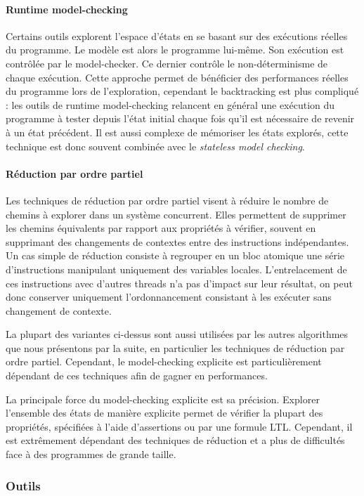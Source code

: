 \paragraph{Runtime model-checking}
Certains outils explorent l'espace d'états en se basant sur des
exécutions réelles du programme. Le modèle est alors le programme lui-même.
Son exécution est contrôlée par le model-checker. Ce dernier contrôle le
non-déterminisme de chaque exécution. Cette approche permet de
bénéficier des performances réelles du programme lors de l'exploration,
cependant le backtracking est plus compliqué : les outils de runtime
model-checking relancent en général une exécution du programme à tester
depuis l'état initial chaque fois qu'il est nécessaire de revenir à un
état précédent. Il est aussi complexe de mémoriser les états explorés,
cette technique est donc souvent combinée avec le \emph{stateless model
checking}.

\paragraph{Réduction par ordre partiel}
Les techniques de réduction par ordre partiel visent à réduire le nombre de
chemins à explorer dans un système concurrent. Elles permettent de supprimer les
chemins équivalents par rapport aux propriétés à vérifier, souvent en supprimant
des changements de contextes entre des instructions indépendantes. Un cas simple
de réduction consiste à regrouper en un bloc atomique une série d'instructions
manipulant uniquement des variables locales. L'entrelacement de ces instructions
avec d'autres threads n'a pas d'impact sur leur résultat, on peut donc conserver
uniquement l'ordonnancement consistant à les exécuter sans changement de
contexte.

La plupart des variantes ci-dessus sont aussi utilisées par les autres
algorithmes que nous présentons par la suite, en particulier les
techniques de réduction par ordre partiel. Cependant, le model-checking
explicite est particulièrement dépendant de ces techniques afin de
gagner en performances.

La principale force du model-checking explicite est sa précision. Explorer
l'ensemble des états de manière explicite permet de vérifier la plupart des
propriétés, spécifiées à l'aide d'assertions ou par une formule \ac{LTL}. Cependant,
il est extrêmement dépendant des techniques de réduction et a plus de
difficultés face à des programmes de grande taille.

\subsubsection{Outils}

